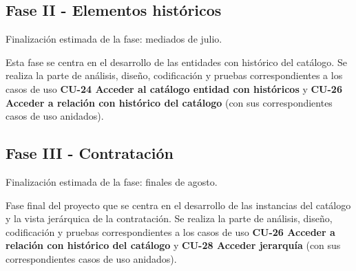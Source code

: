 \subsection{Fase II - Elementos históricos}
Finalización estimada de la fase: mediados de julio.

Esta fase se centra en el desarrollo de las entidades con histórico del catálogo. Se realiza la parte de análisis, diseño, codificación y pruebas correspondientes a los casos de uso \textbf{CU-24 Acceder al catálogo entidad con históricos} y \textbf{CU-26 Acceder a relación con histórico del catálogo} (con sus correspondientes casos de uso anidados).


\subsection{Fase III - Contratación}
Finalización estimada de la fase: finales de agosto.

Fase final del proyecto que se centra en el desarrollo de las instancias del catálogo y la vista jerárquica de la contratación. Se realiza la parte de análisis, diseño, codificación y pruebas correspondientes a los casos de uso \textbf{CU-26 Acceder a relación con histórico del catálogo} y \textbf{CU-28 Acceder jerarquía} (con sus correspondientes casos de uso anidados). 



